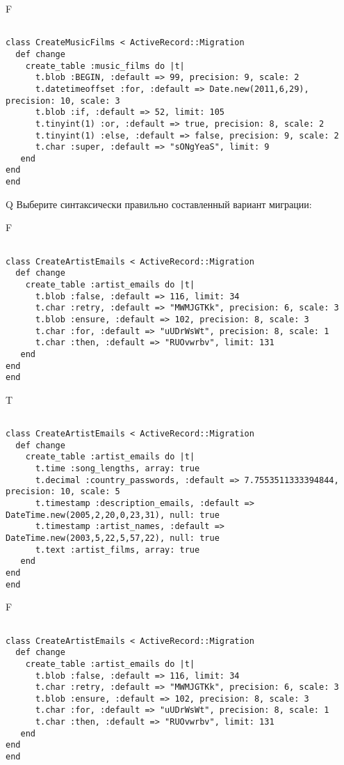 F
\begin{verbatim}
		
class CreateMusicFilms < ActiveRecord::Migration 
  def change 
    create_table :music_films do |t| 
      t.blob :BEGIN, :default => 99, precision: 9, scale: 2
      t.datetimeoffset :for, :default => Date.new(2011,6,29), precision: 10, scale: 3
      t.blob :if, :default => 52, limit: 105
      t.tinyint(1) :or, :default => true, precision: 8, scale: 2
      t.tinyint(1) :else, :default => false, precision: 9, scale: 2
      t.char :super, :default => "sONgYeaS", limit: 9
   end
end
end
\end{verbatim}

Q
Выберите синтаксически правильно составленный вариант миграции:

F
\begin{verbatim}
		
class CreateArtistEmails < ActiveRecord::Migration 
  def change 
    create_table :artist_emails do |t| 
      t.blob :false, :default => 116, limit: 34
      t.char :retry, :default => "MWMJGTKk", precision: 6, scale: 3
      t.blob :ensure, :default => 102, precision: 8, scale: 3
      t.char :for, :default => "uUDrWsWt", precision: 8, scale: 1
      t.char :then, :default => "RUOvwrbv", limit: 131
   end
end
end
\end{verbatim}

T
\begin{verbatim}
		
class CreateArtistEmails < ActiveRecord::Migration 
  def change 
    create_table :artist_emails do |t| 
      t.time :song_lengths, array: true
      t.decimal :country_passwords, :default => 7.7553511333394844, precision: 10, scale: 5
      t.timestamp :description_emails, :default => DateTime.new(2005,2,20,0,23,31), null: true
      t.timestamp :artist_names, :default => DateTime.new(2003,5,22,5,57,22), null: true
      t.text :artist_films, array: true
   end
end
end
\end{verbatim}

F
\begin{verbatim}
		
class CreateArtistEmails < ActiveRecord::Migration 
  def change 
    create_table :artist_emails do |t| 
      t.blob :false, :default => 116, limit: 34
      t.char :retry, :default => "MWMJGTKk", precision: 6, scale: 3
      t.blob :ensure, :default => 102, precision: 8, scale: 3
      t.char :for, :default => "uUDrWsWt", precision: 8, scale: 1
      t.char :then, :default => "RUOvwrbv", limit: 131
   end
end
end
\end{verbatim}

